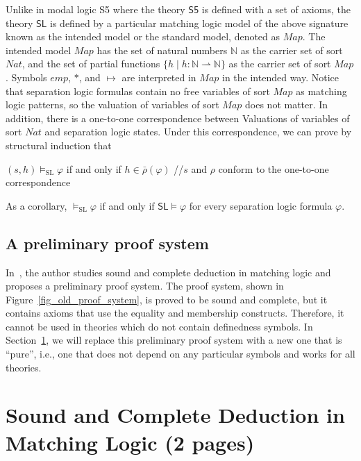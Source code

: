 \documentclass[letter,12pt]{article}
\newcommand{\doubleslash}{//\xspace}
\newcommand{\barrho}{\bar{\rho}}
\newcommand{\MLSfive}{\mathsf{S5}}
\newcommand{\MLSL}{\mathsf{SL}}
\newcommand{\Nat}{\mathit{Nat}}
\newcommand{\Map}{\mathit{Map}}
\newcommand{\emp}{\mathit{emp}}
\newcommand{\merge}{\mathbin{*}}
\newcommand{\pto}{\rightharpoonup}
\newcommand{\SL}{{\text{SL}}}
\begin{document}
\newcommand{\N}{\mathbb{N}}

Unlike in modal logic S5 where the theory $\MLSfive$ is defined with a set of
axioms,
the theory $\MLSL$ is defined by 
a particular matching logic model 
of the above signature
known as the intended model or the standard model, denoted as $\Map$.
The intended model $\Map$ has the set of natural numbers $\N$ as the carrier
set of sort $\Nat$,
and the set of partial functions 
$ \{ h \mid h \colon \N \pto \N \} $
as the carrier set of sort $\Map$.
Symbols $\emp$, $\merge$, and $\mapsto$ are interpreted in $\Map$ in the
intended way.
Notice that separation logic formulas contain no free variables of sort $\Map$
as matching logic patterns,
so the valuation of variables of sort $\Map$ does not matter.
In addition, there is a one-to-one correspondence between 
Valuations of variables of sort $\Nat$ and separation logic states.
Under this correspondence, we can prove by structural induction that
\begin{center}
$(s,h) \vDash_\SL \varphi$
 if and only if 
$h \in \barrho(\varphi)$
\quad \doubleslash $s$ and $\rho$ conform to the one-to-one correspondence
\end{center}
As a corollary,
$\vDash_\SL \varphi$ if and only if
$\MLSL \vDash \varphi$ for every separation logic formula $\varphi$.



\subsection{A preliminary proof system}

In~\cite{rosu-2017-lmcs},
the author studies sound and complete deduction in matching logic
and proposes a preliminary proof system.
The proof system, shown in Figure~\ref{fig_old_proof_system},
is proved to be sound and complete, 
but it contains axioms that use the equality and membership constructs.
Therefore, it cannot be used in theories which do not contain 
definedness symbols.
In Section~\ref{sec_pure_matching_logic},
we will replace this preliminary proof system with
a new one that is ``pure'',
i.e., one that
does not depend on any particular symbols and works for all theories.


\section{Sound and Complete Deduction in Matching Logic (2 pages)}
\label{sec_pure_matching_logic}
\end{document}
